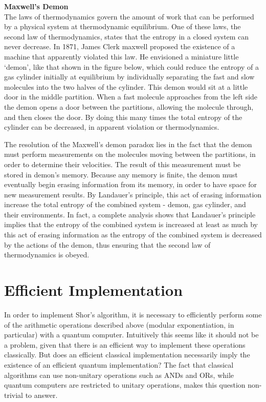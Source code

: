 \begin{importantnote}
    \textbf{Maxwell's Demon}\\
    The laws of thermodynamics govern the amount of work that can be performed by a physical system at thermodynamic equilibrium. One of these laws, the second law of thermodynamics, states that the entropy in a closed system can never decrease. In 1871, James Clerk maxwell proposed the existence of a machine that apparently violated this law. He envisioned a miniature little `demon', like that shown in the figure below, which could reduce the entropy of a gas cylinder initially at equilibrium by individually separating the fast and slow molecules into the two halves of the cylinder. This demon would sit at a little door in the middle partition. When a fast molecule approaches from the left side the demon opens a door between the partitions, allowing the molecule through, and then closes the door. By doing this many times the total entropy of the cylinder can be decreased, in apparent violation or thermodynamics.

    The resolution of the Maxwell's demon paradox lies in the fact that the demon must perform measurements on the molecules moving between the partitions, in order to determine their velocities. The result of this measurement must be stored in demon's memory. Because any memory is finite, the demon must eventually begin erasing information from its memory, in order to have space for new measurement results. By Landauer's principle, this act of erasing information increase the total entropy of the combined system - demon, gas cylinder, and their environments. In fact, a complete analysis shows that Landauer's principle implies that the entropy of the combined system is increased at least as much by this act of erasing information as the entropy of the combined system is decreased by the actions of the demon, thus ensuring that the second law of thermodynamics is obeyed.
\end{importantnote}
\section{Efficient Implementation}
In order to implement Shor's algorithm, it is necessary to efficiently perform some of the arithmetic operations described above (modular exponentiation, in particular) with a quantum computer. Intuitively this seems like it should not be a problem, given that there is an efficient way to implement these operations classically. But does an efficient classical implementation necessarily imply the existence of an efficient quantum implementation? The fact that classical algorithms can use non-unitary operations such as ANDs and ORs, while quantum computers are restricted to unitary operations, makes this question non-trivial to answer.

